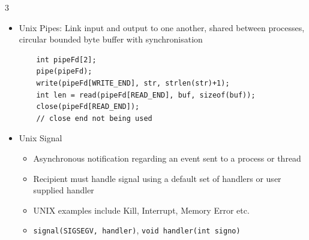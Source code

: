 \documentclass[10pt, landscape]{article}
\begin{document}
\begin{multicols*}{3}
\begin{itemize}
    \item Unix Pipes: Link input and output to one another, shared between processes, circular bounded byte buffer with synchronisation
        \begin{verbatim}
    int pipeFd[2];
    pipe(pipeFd);
    write(pipeFd[WRITE_END], str, strlen(str)+1);
    int len = read(pipeFd[READ_END], buf, sizeof(buf));
    close(pipeFd[READ_END]);
    // close end not being used
        \end{verbatim}
    \item Unix Signal
    \begin{itemize}
        \item Asynchronous notification regarding an event sent to a process or thread
        \item Recipient must handle signal using a default set of handlers or user supplied handler
        \item UNIX examples include Kill, Interrupt, Memory Error etc.
        \item \verb|signal(SIGSEGV, handler)|, \verb|void handler(int signo)|
    \end{itemize}
\end{itemize}


\end{multicols*}
\end{document}
